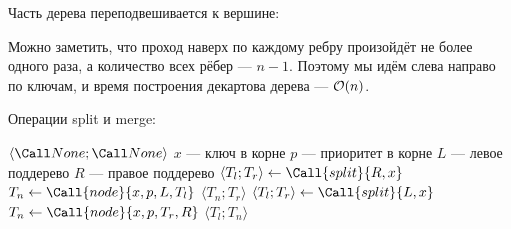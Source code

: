 \bigskip

\noindent
\begin{minipage}{\textwidth}
    \begin{center}
        Часть дерева переподвешивается к вершине:

    \end{center}
\end{minipage}

\bigskip

Можно заметить, что проход наверх по каждому ребру
произойдёт не более одного раза, а количество
всех рёбер --- $n - 1$.
Поэтому мы идём слева направо по ключам,
и время построения декартова дерева --- $\mathcal{O}(n)$.

Операции split и merge:

\noindent
\begin{minipage}{\textwidth}
    \begin{algorithmic}
                \Return $\langle \None; \None \rangle$
            \EndIf
            \State $x$ --- ключ в корне
            \State $p$ --- приоритет в корне
            \State $L$ --- левое поддерево
            \State $R$ --- правое поддерево
                \State $\langle T_l; T_r \rangle \gets \Call{split}{R, x}$
                \State $T_n \gets \Call{node}{x, p, L, T_l}$
                \State \Return $\langle T_n; T_r \rangle$
            \Else
                \State $\langle T_l; T_r \rangle \gets \Call{split}{L, x}$
                \State $T_n \gets \Call{node}{x, p, T_r, R}$
                \State \Return $\langle T_l; T_n \rangle$
            \EndIf
        \EndFunction
    \end{algorithmic}
\end{minipage}

\bigskip

